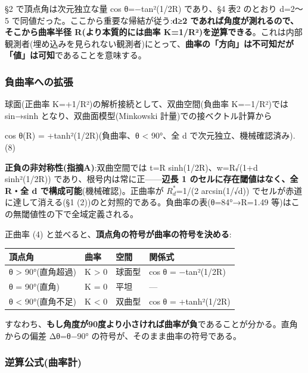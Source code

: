\documentclass[
]{ltjsarticle}
\newcounter{none} %
\begin{document}
§2 で頂点角は次元独立な量 cos θ=−tan²(1/2R) であり、§4 表2 のとおり
d=2〜5 で同値だった。ここから重要な帰結が従う:\textbf{d≥2
であれば角度が測れるので、そこから曲率半径 R(より本質的には曲率
K=1/R²)を逆算できる}。これは内部観測者(埋め込みを見られない観測者)にとって、\textbf{曲率の「方向」は不可知だが「値」は可知}であることを意味する。

\subsubsection{負曲率への拡張}\label{ux8ca0ux66f2ux7387ux3078ux306eux62e1ux5f35}

球面(正曲率 K=+1/R²)の解析接続として、双曲空間(負曲率 K=−1/R²)では
sin→sinh となり、双曲面模型(Minkowski 計量)での接ベクトル計算から

cos θ(R) = +tanh²(1/2R)(負曲率、θ \textless{} 90°、全 d
で次元独立、機械確認済み). (8)

\textbf{正負の非対称性(指摘A)}:双曲空間では t=R sinh(1/2R)、w=R√(1+d
sinh²(1/2R)) であり、根号内は常に正------\textbf{辺長 1
のセルに存在閾値はなく、全 R・全 d で構成可能}(機械確認)。正曲率が
\(R^{*}_{d}\)=1/(2 arcsin(1/√d)) でセルが赤道に達して消える(§1
(2))のと対照的である。負曲率の表(θ=84°→R=1.49
等)はこの無閾値性の下で全域定義される。

正曲率 (4) と並べると、\textbf{頂点角の符号が曲率の符号を決める}:

{\def\LTcaptype{none} %
\begin{longtable}[]{@{}llll@{}}
\toprule\noalign{}
頂点角 & 曲率 & 空間 & 関係式 \\
\midrule\noalign{}
\endhead
\bottomrule\noalign{}
\endlastfoot
θ \textgreater{} 90°(直角超過) & K \textgreater{} 0 & 球面型 & cos θ =
−tan²(1/2R) \\
θ = 90°(直角) & K = 0 & 平坦 & --- \\
θ \textless{} 90°(直角不足) & K \textless{} 0 & 双曲型 & cos θ =
+tanh²(1/2R) \\
\end{longtable}
}

すなわち、\textbf{もし角度が90度より小さければ曲率が負}であることが分かる。直角からの偏差
Δθ=θ−90° の符号が、そのまま曲率の符号である。

\subsubsection{逆算公式(曲率計)}\label{ux9006ux7b97ux516cux5f0fux66f2ux7387ux8a08}
\end{document}
